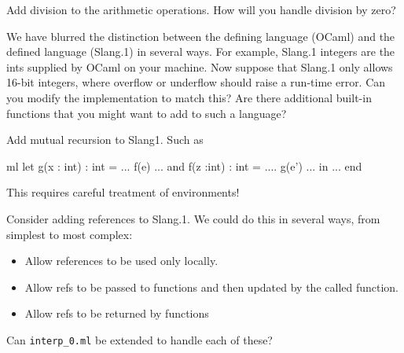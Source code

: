 \documentclass{supervision}
\begin{document}
\begin{questions}
    \question Add division to the arithmetic operations. How will
      you handle division by zero?

    \question We have blurred the distinction between the defining language
      (OCaml) and the defined language (Slang.1) in several ways.  For example,
      Slang.1 integers are the ints supplied by OCaml on your machine. Now
      suppose that Slang.1 only allows 16-bit integers, where overflow or
      underflow should raise a run-time error.  Can you modify the
      implementation to match this? Are there additional built-in functions that
      you might want to add to such a language?

    \question Add mutual recursion to Slang1.  Such as

      \begin{code}{ml}
        let g(x : int) : int = ... f(e) ...
        and f(z :int) : int  = .... g(e') ...
        in ... end
      \end{code}

      This requires careful treatment of environments!

    \question Consider adding references to Slang.1. We could do this in
      several ways, from simplest to most complex:
      \begin{itemize}
        \item Allow references to be used only locally.
        \item Allow refs to be passed to functions and then updated by the
          called function.
        \item Allow refs to be returned by functions
      \end{itemize}

      Can \lstinline|interp_0.ml| be extended to handle each of these?
  \end{questions}
\end{document}

